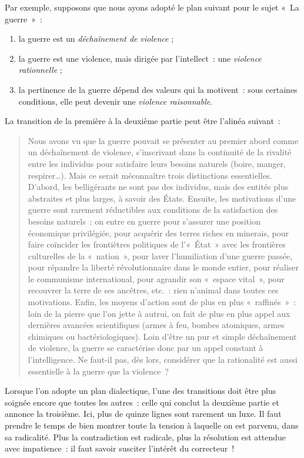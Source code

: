 \documentclass[a4paper,12pt]{article}
\begin{document}
Par exemple, supposons que nous ayons adopté le plan suivant pour le
sujet « La guerre » :

\begin{enumerate}
\item la guerre est un \emph{déchaînement de violence} ;

\item la guerre est une violence, mais dirigée par l'intellect : une
\emph{violence rationnelle} ;

\item la pertinence de la guerre dépend des valeurs qui la motivent : sous
certaines conditions, elle peut devenir une \emph{violence raisonnable}.
\end{enumerate}

La transition de la première à la deuxième partie peut être l'alinéa
suivant :

\begin{quote}
Nous avons vu que la guerre pouvait se présenter au premier abord
comme un déchaînement de violence, s'inscrivant dans la continuité de
la rivalité entre les individus pour satisfaire leurs besoins naturels
(boire, manger, respirer\ldots{}). Mais ce serait méconnaître trois
distinctions essentielles. D'abord, les belligérants ne sont pas des
individus, mais des entités plus abstraites et plus larges, à savoir
des États. Ensuite, les motivations d'une guerre sont rarement
réductibles aux conditions de la satisfaction des besoins naturels :
on entre en guerre pour s'assurer une position économique privilégiée,
pour acquérir des terres riches en minerais, pour faire coïncider les
frontiètres politiques de l'« État » avec les frontières culturelles de
la « nation », pour laver l'humiliation d'une guerre passée, pour
répandre la liberté révolutionnaire dans le monde entier, pour
réaliser le communisme international, pour agrandir son « espace
vital », pour recouvrer la terre de ses ancêtres, etc. : rien n'animal
dans toutes ces motivations. Enfin, les moyens d'action sont de plus
en plus « raffinés » : loin de la pierre que l'on jette à autrui, on
fait de plus en plus appel aux dernières avancées scientifiques (armes
à feu, bombes atomiques, armes chimiques ou bactériologiques). Loin
d'être un pur et simple déchaînement de violence, la guerre se
caractérise donc par un appel constant à l'intelligence. Ne faut-il
pas, dès lors, considérer que la rationalité est aussi essentielle à
la guerre que la violence ?
\end{quote}

Lorsque l'on adopte un plan dialectique, l'une des transitions doit être
plus soignée encore que toutes les autres : celle qui conclut la
deuxième partie et annonce la troisième. Ici, plus de quinze lignes sont
rarement un luxe. Il faut prendre le temps de bien montrer toute la
tension à laquelle on est parvenu, dans sa radicalité. Plus la
contradiction est radicale, plus la résolution est attendue avec
impatience : il faut savoir susciter l'intérêt du correcteur !
\end{document}
